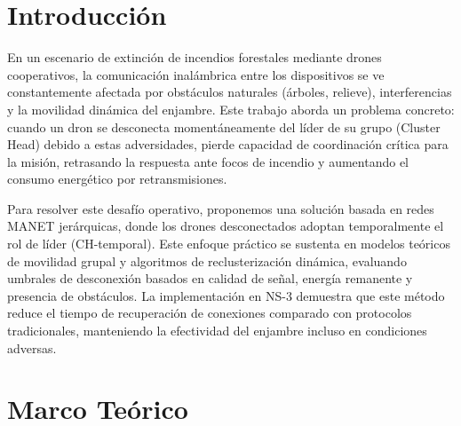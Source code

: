 \documentclass{article}
\begin{document}
\tableofcontents %

\newpage %



\section{Introducción}\label{sec:intr}

En un escenario de extinción de incendios forestales mediante drones cooperativos, la comunicación inalámbrica entre los dispositivos se ve constantemente afectada por obstáculos naturales (árboles, relieve), interferencias y la movilidad dinámica del enjambre. Este trabajo aborda un problema concreto: cuando un dron se desconecta momentáneamente del líder de su grupo (Cluster Head) debido a estas adversidades, pierde capacidad de coordinación crítica para la misión, retrasando la respuesta ante focos de incendio y aumentando el consumo energético por retransmisiones.

Para resolver este desafío operativo, proponemos una solución basada en redes MANET jerárquicas, donde los drones desconectados adoptan temporalmente el rol de líder (CH-temporal). Este enfoque práctico se sustenta en modelos teóricos de movilidad grupal y algoritmos de reclusterización dinámica, evaluando umbrales de desconexión basados en calidad de señal, energía remanente y presencia de obstáculos. La implementación en NS-3 demuestra que este método reduce el tiempo de recuperación de conexiones comparado con protocolos tradicionales, manteniendo la efectividad del enjambre incluso en condiciones adversas.



\section{Marco Teórico}\label{sec:marc}
\end{document}
